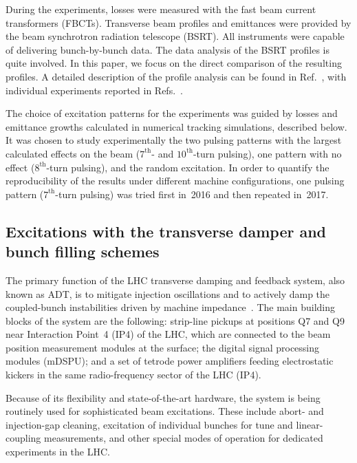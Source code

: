 \documentclass[%
 reprint,
 amsmath,amssymb,
 aps,
prstab,
longbibliography
]{revtex4-1}
\begin{document}
During the experiments, losses were measured with the fast beam
current transformers (FBCTs). Transverse beam profiles and emittances
were provided by the beam synchrotron radiation telescope (BSRT). All
instruments were capable of delivering bunch-by-bunch data. The data
analysis of the BSRT profiles is quite involved. In this paper, we
focus on the direct comparison of the resulting profiles. A detailed
description of the profile analysis can be found in
Ref.~\cite{bsrtprofinj}, with individual experiments reported in
Refs.~\cite{resexmd2016, resexmd2017}.

The choice of excitation patterns for the experiments was guided by
losses and emittance growths calculated in numerical tracking
simulations, described below. It was chosen to study experimentally
the two pulsing patterns with the largest calculated effects on the
beam ($7^{\mathrm{th}}$- and $10^{\mathrm{th}}$-turn pulsing), one
pattern with no effect ($8^{\mathrm{th}}$-turn pulsing), and the
random excitation. In order to quantify the reproducibility of the
results under different machine configurations, one pulsing pattern
($7^{\mathrm{th}}$-turn pulsing) was tried first in~2016 and then
repeated in~2017.


\subsection{Excitations with the transverse damper and bunch filling schemes}
\label{sec:adt}

The primary function of the LHC transverse damping and feedback
system, also known as ADT, is to mitigate injection oscillations and
to actively damp the coupled-bunch instabilities driven by machine
impedance~\cite{adt_sum_2008, adt_sum_2011}. The main building blocks
of the system are the following: strip-line pickups at positions Q7
and Q9 near Interaction Point~4 (IP4) of the LHC, which are connected
to the beam position measurement modules at the surface; the digital
signal processing modules (mDSPU); and a set of tetrode power
amplifiers feeding electrostatic kickers in the same radio-frequency
sector of the LHC (IP4).

Because of its flexibility and state-of-the-art hardware, the system
is being routinely used for sophisticated beam excitations. These
include abort- and injection-gap cleaning, excitation of individual
bunches for tune and linear-coupling measurements, and other special
modes of operation for dedicated experiments in the LHC.
\end{document}
